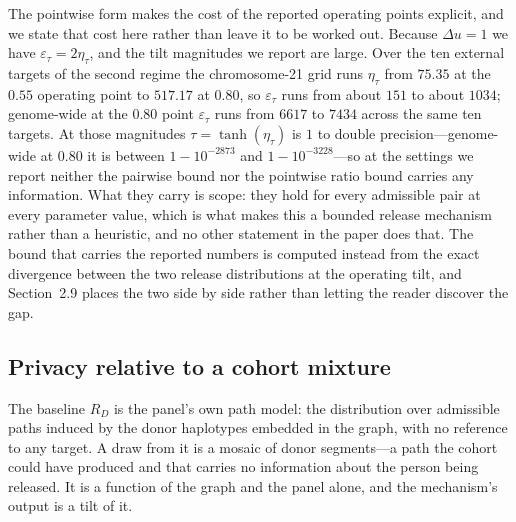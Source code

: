 The pointwise form makes the cost of the reported operating points explicit, and we
state that cost here rather than leave it to be worked out. Because $\Delta u = 1$ we
have $\varepsilon_\tau = 2\eta_\tau$, and the tilt magnitudes we report are large.
Over the ten external targets of the second regime the chromosome-21 grid runs
$\eta_\tau$ from $75.35$ at the $0.55$ operating point to $517.17$ at $0.80$, so
$\varepsilon_\tau$ runs from about $151$ to about $1034$; genome-wide at the $0.80$
point $\varepsilon_\tau$ runs from $6617$ to $7434$ across the same ten targets. At
those magnitudes $\tau = \tanh(\eta_\tau)$ is $1$ to double precision---genome-wide
at $0.80$ it is between $1 - 10^{-2873}$ and $1 - 10^{-3228}$---so at the settings we
report neither the pairwise bound nor the pointwise ratio bound carries any
information. What they carry is scope: they hold for every admissible pair at every
parameter value, which is what makes this a bounded release mechanism rather than a
heuristic, and no other statement in the paper does that. The bound that carries the
reported numbers is computed instead from the exact divergence between the two
release distributions at the operating tilt, and Section~2.9 places the two side by
side rather than letting the reader discover the gap.

\subsection{Privacy relative to a cohort mixture}

The baseline $R_D$ is the panel's own path model: the distribution over admissible
paths induced by the donor haplotypes embedded in the graph, with no reference to any
target. A draw from it is a mosaic of donor segments---a path the cohort could have
produced and that carries no information about the person being released. It is a
function of the graph and the panel alone, and the mechanism's output is a tilt of
it.

